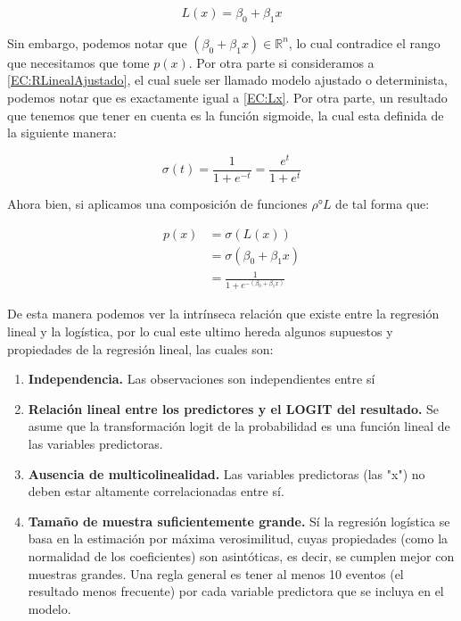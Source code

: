 \begin{equation}
	L(x)=\beta_0+\beta_1 x
	\label{EC:Lx}
\end{equation}

Sin embargo, podemos notar que $(\beta_0+\beta_1 x)\in \mathbb{R}^n$, lo cual contradice el rango que necesitamos que tome $p(x)$. Por otra parte si consideramos a \eqref{EC:RLinealAjustado}, el cual suele ser llamado modelo ajustado o determinista, podemos notar que es exactamente igual a \eqref{EC:Lx}. Por otra parte, un resultado que tenemos que tener en cuenta es la función sigmoide, la cual esta definida de la siguiente manera:

\begin{equation}
	\sigma(t)=\frac{1}{1+e^{-t}}=\frac{e^t}{1+e^t}
\end{equation}

Ahora bien, si aplicamos una composición de funciones $\rho ° L$ de tal forma que:

\begin{align*}
	p(x) &= \sigma(L(x)) \\
	&= \sigma(\beta_0+\beta_1 x) \\
	&= \frac{1}{1+e^{-(\beta_0+\beta_1 x)}}
\end{align*}

De esta manera podemos ver la intrínseca relación que existe entre la regresión lineal y la logística, por lo cual este ultimo hereda algunos supuestos y propiedades de la regresión lineal, las cuales son:

\begin{enumerate}
	\item \textbf{Independencia.} Las observaciones son independientes entre sí
	
	\item \textbf{Relación lineal entre los predictores y el LOGIT del resultado. } Se asume que la transformación logit de la probabilidad es una función lineal de las variables predictoras.
	
	\item \textbf{ Ausencia de multicolinealidad.} Las variables predictoras (las "x") no deben estar altamente correlacionadas entre sí. 
	
	\item \textbf{Tamaño de muestra suficientemente grande.} Sí la regresión logística se basa en la estimación por máxima verosimilitud, cuyas propiedades (como la normalidad de los coeficientes) son asintóticas, es decir, se cumplen mejor con muestras grandes. Una regla general es tener al menos 10 eventos (el resultado menos frecuente) por cada variable predictora que se incluya en el modelo.
	
\end{enumerate}

